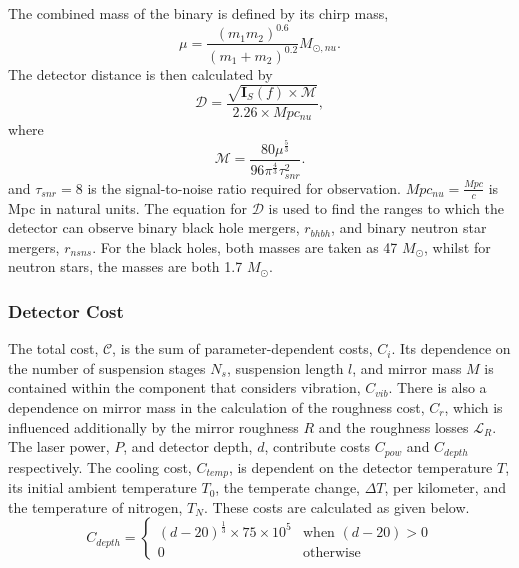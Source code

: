 \documentclass{article}
\begin{document}
    The combined mass of the binary is defined by its chirp mass,
    \[
    \mu = \frac{(m_1m_2)^{0.6}}{(m_1 + m_2)^{0.2}}M_{\odot,nu}.
    \]
    The detector distance is then calculated by
    \[
    \mathcal{D} = \frac{\sqrt{\mathbf{I}_S(f) \times \mathcal{M}}}{2.26 \times Mpc_{nu}},
    \]
    where
    \[
    \mathcal{M} = \frac{80\mu^{\frac{5}{3}}}{96\pi^{\frac{4}{3}}\tau_{snr}^2}.
    \]
   and $\tau_{snr} = 8$ is the signal-to-noise ratio required for
   observation. $Mpc_{nu} = \frac{Mpc}{c}$ is Mpc in natural
   units. The equation for $\mathcal{D}$ is used to find the ranges to
   which the detector can observe binary black hole mergers,
   $r_{bhbh}$, and binary neutron star mergers, $r_{nsns}$. For the
   black holes, both masses are taken as 47 $M_{\odot}$, whilst for
   neutron stars, the masses are both 1.7 $M_{\odot}$.

\subsubsection{Detector Cost}
The total cost, $\mathcal{C}$, is the sum of parameter-dependent
costs, $C_i$. Its dependence on the number of suspension stages $N_s$,
suspension length $l$, and mirror mass $M$ is contained within the
component that considers vibration, $C_{vib}$. There is also a
dependence on mirror mass in the calculation of the roughness cost,
$C_r$, which is influenced additionally by the mirror roughness $R$
and the roughness losses $\mathcal{L}_R$. The laser power, $P$, and
detector depth, $d$, contribute costs $C_{pow}$ and $C_{depth}$
respectively. The cooling cost, $C_{temp}$, is dependent on the
detector temperature $T$, its initial ambient temperature $T_0$, the
temperate change, $\Delta T$, per kilometer, and the temperature of
nitrogen, $T_N$. These costs are calculated as given below.
    \[C_{depth} = \begin{cases}
                  (d-20)^{\frac{1}{3}} \times 75 \times 10^5 & \text{when $(d-20) > 0$} \\
                  0 & \text{otherwise}
                  \end{cases}
    \]
    
\end{document}
